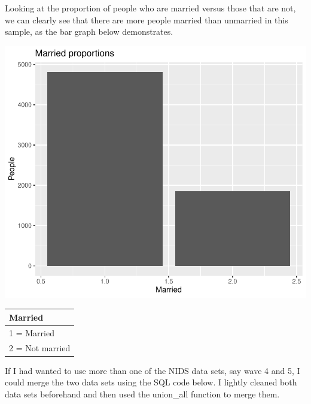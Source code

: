 \documentclass[11pt,preprint, authoryear]{elsarticle}
\numberwithin{equation}{section}
\numberwithin{figure}{section}
\numberwithin{table}{section}
\begin{document}
Looking at the proportion of people who are married versus those that
are not, we can clearly see that there are more people married than
unmarried in this sample, as the bar graph below demonstrates.

\includegraphics{20346212MLProject_files/figure-latex/unnamed-chunk-7-1.pdf}

\begin{tabular}{l}
\hline
Married\\
\hline
1 = Married\\
\hline
2 = Not married\\
\hline
\end{tabular}

If I had wanted to use more than one of the NIDS data sets, say wave 4
and 5, I could merge the two data sets using the SQL code below. I
lightly cleaned both data sets beforehand and then used the union\_all
function to merge them.
\end{document}
